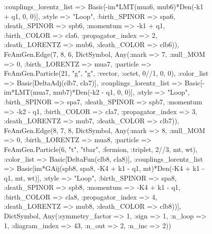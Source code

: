 \documentclass{revtex4}
\begin{document}
\begin{figure}[!htb]
\begin{center}
{:couplings_lorentz_list => Basic[-im*LMT(mua6, mub6)*Den(-k1 + q1, 0, 0)], :style => "Loop", :birth_SPINOR => spa6, :death_SPINOR => spb6, :momentum => -k1 + q1, :birth_COLOR => cla6, :propagator_index => 2, :death_LORENTZ => mub6, :death_COLOR => clb6)), FeAmGen.Edge(7, 8, 6, Dict{Symbol, Any}(:mark => 7, :null_MOM => 0, :birth_LORENTZ => mua7, :particle => FeAmGen.Particle(21, "g", "g", :vector, :octet, 0//1, 0, 0), :color_list => Basic[DeltaAdj(clb7, cla7)], :couplings_lorentz_list => Basic[-im*LMT(mua7, mub7)*Den(-k2 - q1, 0, 0)], :style => "Loop", :birth_SPINOR => spa7, :death_SPINOR => spb7, :momentum => -k2 - q1, :birth_COLOR => cla7, :propagator_index => 3, :death_LORENTZ => mub7, :death_COLOR => clb7)), FeAmGen.Edge(8, 7, 8, Dict{Symbol, Any}(:mark => 8, :null_MOM => 0, :birth_LORENTZ => mua8, :particle => FeAmGen.Particle(6, "t", "tbar", :fermion, :triplet, 2//3, mt, wt), :color_list => Basic[DeltaFun(clb8, cla8)], :couplings_lorentz_list => Basic[im*GAij(spb8, spa8, -K4 + k1 - q1, mt)*Den(-K4 + k1 - q1, mt, wt)], :style => "Loop", :birth_SPINOR => spa8, :death_SPINOR => spb8, :momentum => -K4 + k1 - q1, :birth_COLOR => cla8, :propagator_index => 4, :death_LORENTZ => mub8, :death_COLOR => clb8))], Dict{Symbol, Any}(:symmetry_factor => 1, :sign => 1, :n_loop => 1, :diagram_index => 43, :n_out => 2, :n_inc => 2)) 
}
\end{center}
\end{figure}
\end{document}
